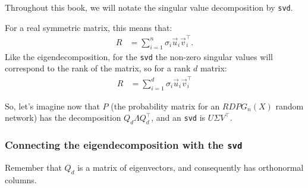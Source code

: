 Throughout this book, we will notate the singular value decomposition by \texttt{svd}.

For a real symmetric matrix, this means that:
\begin{align*}
    R &= \sum_{i = 1}^n \sigma_i \vec u_i \vec v_i^\top.
\end{align*}
Like the eigendecomposition, for the \texttt{svd} the non-zero singular values will correspond to the rank of the matrix, so for a rank $d$ matrix:
\begin{align*}
    R &= \sum_{i = 1}^d \sigma_i \vec u_i \vec v_i^\top
\end{align*}

So, let's imagine now that $P$ (the probability matrix for an $RDPG_n(X)$ random network) has the decomposition $Q_d \Lambda Q_d^\top$, and an \texttt{svd} is $U \Sigma V^\top$.

\subsubsection{Connecting the eigendecomposition with the \texttt{svd}}

Remember that $Q_d$ is a matrix of eigenvectors, and consequently has orthonormal columns.


